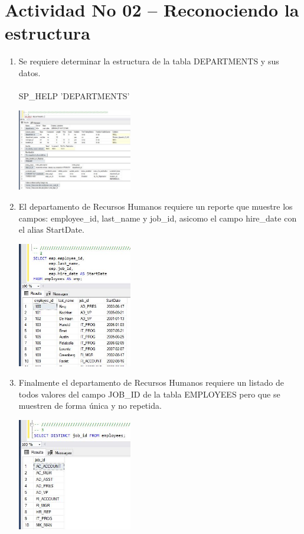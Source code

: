 \section{Actividad No 02 – Reconociendo la estructura} 

\begin{enumerate}[1.]
	\item Se requiere determinar la estructura de la tabla DEPARTMENTS y sus datos.
	\\
	\\SP\_HELP 'DEPARTMENTS'

	\begin{center}
	\includegraphics[width=5cm]{./Imagenes/actividad0201} 
	\end{center}

	\item El departamento de Recursos Humanos requiere un reporte que muestre los campos: employee\_id, last\_name y job\_id, asicomo el campo hire\_date con el alias StartDate.

	\begin{center}
	\includegraphics[width=5cm]{./Imagenes/actividad0202} 
	\end{center}

	\item Finalmente el departamento de Recursos Humanos requiere un listado de todos valores del campo JOB\_ID de la tabla EMPLOYEES pero que se muestren de forma única y no repetida.

	\begin{center}
	\includegraphics[width=5cm]{./Imagenes/actividad0203} 
	\end{center}

\end{enumerate}


